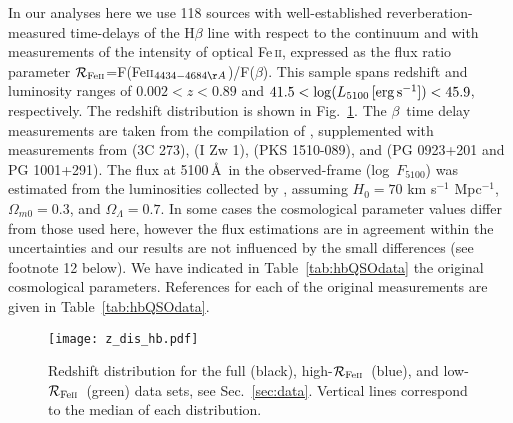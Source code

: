 \documentclass[a4paper,fleqn,usenatbib]{mnras}
\newcommand{\rfe}{${\cal R}_{\rm{Fe\textsc{ii}}}$}
\newcommand{\Feii}{Fe\,\textsc{ii}}
\newcommand{\hb}{{\sc{H}}$\beta$\/}
\begin{document}
In our analyses here we use 118 sources with well-established reverberation-measured time-delays of the H$\beta$ line with respect to the continuum and with measurements of the intensity of optical \Feii, expressed as the flux ratio parameter \rfe=F(Fe\textsc{ii}$_{4434-4684\AA}$)/F(\hb). This sample spans redshift and luminosity ranges of $0.002<z<0.89$ and $41.5< \log(L_{5100}\,[{\rm erg\,s^{-1}}])<45.9$, respectively. The redshift distribution is shown in Fig.\ \ref{fig:hist_z}. The \hb\ time delay measurements are taken from the compilation of \citet{Mary2019}, supplemented with measurements from \citet{zhang_2018} (3C 273), \citet{huang2019} (I Zw 1), \citet{rakshit2020} (PKS 1510-089), and \citet{li_2021} (PG 0923+201 and PG 1001+291). The flux at 5100\,\AA\ in the observed-frame (log~$F_{5100}$) was estimated from the luminosities collected by \citet{Mary2019}, assuming $H_0 = 70$ km s$^{-1}$ Mpc$^{-1}$, $\Omega_{m0} = 0.3$, and $\Omega_\Lambda = 0.7$. In some cases the cosmological parameter values differ from those used here, however the flux estimations are in agreement within the uncertainties and our results are not influenced by the small differences (see footnote 12 below). We have indicated in Table~\ref{tab:hbQSOdata} the  original cosmological parameters. References for each of the original measurements are given in Table~\ref{tab:hbQSOdata}.

\begin{figure}
 \texttt{[image: z\_dis\_hb.pdf]}
\caption{Redshift distribution for the full (black), high-\rfe\ (blue), and low-\rfe\ (green) data sets, see Sec.~\ref{sec:data}. Vertical lines correspond to the median of each distribution.}
\label{fig:hist_z}
\end{figure}
\end{document}
